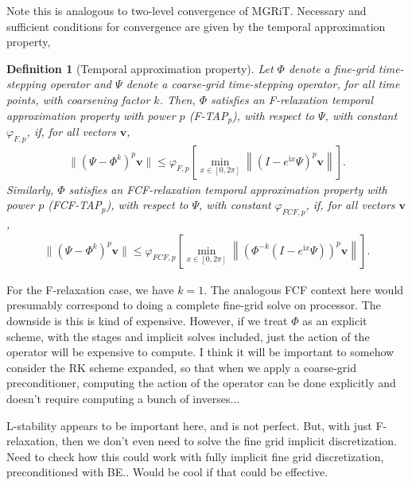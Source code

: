 \documentclass[a4paper,10pt]{article}
\newtheorem{definition}{Definition}
\begin{document}
Note this is analogous to two-level convergence of MGRiT. Necessary and sufficient conditions
for convergence are given by the temporal approximation property,
%
\begin{definition}[Temporal approximation property]
Let $\Phi$ denote a fine-grid time-stepping operator and $\Psi$ denote a coarse-grid time-stepping operator, for all time points,
with coarsening factor $k$. Then, $\Phi$ satisfies an F-relaxation temporal approximation property with power $p$
(F-TAP$_p$), with respect to $\Psi$, with constant $\varphi_{F,p}$, if, for all vectors $\mathbf{v}$,
\begin{align}\label{eq:tap_f}
\|(\Psi - \Phi^k)^p\mathbf{v}\| \leq \varphi_{F,p} \left[\min_{x\in[0,2\pi]} \left\| (I - e^{\mathrm{i}x}\Psi )^p\mathbf{v}\right\| \right].
\end{align}
Similarly, $\Phi$ satisfies an FCF-relaxation temporal approximation property with power $p$ (FCF-TAP$_p$), with
respect to $\Psi$, with constant $\varphi_{FCF,p}$, if, for all vectors $\mathbf{v}$,
\begin{align}\label{eq:tap_fcf}
\|(\Psi - \Phi^k)^p\mathbf{v}\| \leq \varphi_{FCF,p}\left[\min_{x\in[0,2\pi]} \left\| (\Phi^{-k}(I - e^{\mathrm{i}x}\Psi) )^p\mathbf{v}\right\| \right].
\end{align}
\end{definition}
%
For the F-relaxation case, we have $k = 1$. The analogous FCF context here would presumably
correspond to doing a complete fine-grid solve on processor. The downside is this is kind of
expensive. However, if we treat $\Phi$ as an explicit scheme, with the stages and implicit 
solves included, just the action of the operator will be expensive to compute. I think it will
be important to somehow consider the RK scheme expanded, so that when we apply a coarse-grid
preconditioner, computing the action of the operator can be done explicitly and doesn't require
computing a bunch of inverses...

L-stability appears to be important here, and is not perfect. But, with just F-relaxation, then
we don't even need to solve the fine grid implicit discretization. Need to check how this could
work with fully implicit fine grid discretization, preconditioned with BE.. Would be cool if that
could be effective. 


\end{document}
